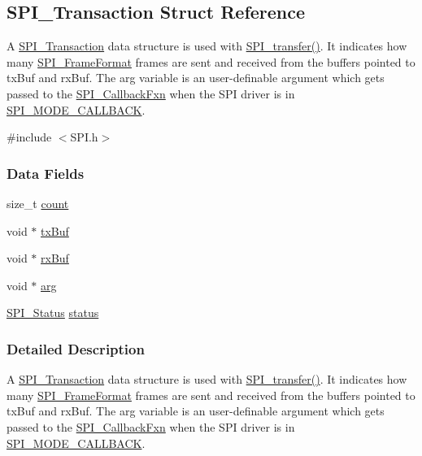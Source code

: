 \subsection{S\+P\+I\+\_\+\+Transaction Struct Reference}
\label{struct_s_p_i___transaction}


A \hyperlink{struct_s_p_i___transaction}{S\+P\+I\+\_\+\+Transaction} data structure is used with \hyperlink{_s_p_i_8h_a989e17f96b54fcc3dc2cac5f8ac6bdb2}{S\+P\+I\+\_\+transfer()}. It indicates how many \hyperlink{_s_p_i_8h_a53949638d43ae7bf71b74c2b136ad206}{S\+P\+I\+\_\+\+Frame\+Format} frames are sent and received from the buffers pointed to tx\+Buf and rx\+Buf. The arg variable is an user-\/definable argument which gets passed to the \hyperlink{_s_p_i_8h_a207e2d5a7e7ea5606b6995b6485ca015}{S\+P\+I\+\_\+\+Callback\+Fxn} when the S\+P\+I driver is in \hyperlink{_s_p_i_8h_ab9ea76c6529d6076eee5e1c4a5a92c6fa5631e69925c47a62a261c78ebbda39fb}{S\+P\+I\+\_\+\+M\+O\+D\+E\+\_\+\+C\+A\+L\+L\+B\+A\+C\+K}.  




{\ttfamily \#include $<$S\+P\+I.\+h$>$}

\subsubsection*{Data Fields}
\begin{DoxyCompactItemize}
\item 
size\+\_\+t \hyperlink{struct_s_p_i___transaction_ad049d6a900c4bdb59a5ee8ce3d5bced2}{count}
\item 
void $\ast$ \hyperlink{struct_s_p_i___transaction_a9461a248f1cceb4048668d44b323a0b8}{tx\+Buf}
\item 
void $\ast$ \hyperlink{struct_s_p_i___transaction_a214f57d7809c875fb9456a62a406e041}{rx\+Buf}
\item 
void $\ast$ \hyperlink{struct_s_p_i___transaction_ac47daaa10705d748ace918a098aa1945}{arg}
\item 
\hyperlink{_s_p_i_8h_a913c57c335166de9caa54b7eb9ad95fb}{S\+P\+I\+\_\+\+Status} \hyperlink{struct_s_p_i___transaction_aa244504b2384411f7de17340be62128a}{status}
\end{DoxyCompactItemize}


\subsubsection{Detailed Description}
A \hyperlink{struct_s_p_i___transaction}{S\+P\+I\+\_\+\+Transaction} data structure is used with \hyperlink{_s_p_i_8h_a989e17f96b54fcc3dc2cac5f8ac6bdb2}{S\+P\+I\+\_\+transfer()}. It indicates how many \hyperlink{_s_p_i_8h_a53949638d43ae7bf71b74c2b136ad206}{S\+P\+I\+\_\+\+Frame\+Format} frames are sent and received from the buffers pointed to tx\+Buf and rx\+Buf. The arg variable is an user-\/definable argument which gets passed to the \hyperlink{_s_p_i_8h_a207e2d5a7e7ea5606b6995b6485ca015}{S\+P\+I\+\_\+\+Callback\+Fxn} when the S\+P\+I driver is in \hyperlink{_s_p_i_8h_ab9ea76c6529d6076eee5e1c4a5a92c6fa5631e69925c47a62a261c78ebbda39fb}{S\+P\+I\+\_\+\+M\+O\+D\+E\+\_\+\+C\+A\+L\+L\+B\+A\+C\+K}. 

